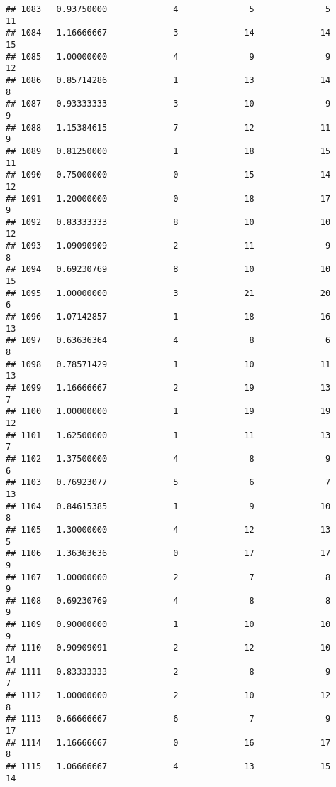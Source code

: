 \documentclass[
]{article}
\begin{document}
\begin{verbatim}
## 1083   0.93750000             4              5              5             11
## 1084   1.16666667             3             14             14             15
## 1085   1.00000000             4              9              9             12
## 1086   0.85714286             1             13             14              8
## 1087   0.93333333             3             10              9              9
## 1088   1.15384615             7             12             11              9
## 1089   0.81250000             1             18             15             11
## 1090   0.75000000             0             15             14             12
## 1091   1.20000000             0             18             17              9
## 1092   0.83333333             8             10             10             12
## 1093   1.09090909             2             11              9              8
## 1094   0.69230769             8             10             10             15
## 1095   1.00000000             3             21             20              6
## 1096   1.07142857             1             18             16             13
## 1097   0.63636364             4              8              6              8
## 1098   0.78571429             1             10             11             13
## 1099   1.16666667             2             19             13              7
## 1100   1.00000000             1             19             19             12
## 1101   1.62500000             1             11             13              7
## 1102   1.37500000             4              8              9              6
## 1103   0.76923077             5              6              7             13
## 1104   0.84615385             1              9             10              8
## 1105   1.30000000             4             12             13              5
## 1106   1.36363636             0             17             17              9
## 1107   1.00000000             2              7              8              9
## 1108   0.69230769             4              8              8              9
## 1109   0.90000000             1             10             10              9
## 1110   0.90909091             2             12             10             14
## 1111   0.83333333             2              8              9              7
## 1112   1.00000000             2             10             12              8
## 1113   0.66666667             6              7              9             17
## 1114   1.16666667             0             16             17              8
## 1115   1.06666667             4             13             15             14

\end{verbatim}
\end{document}
